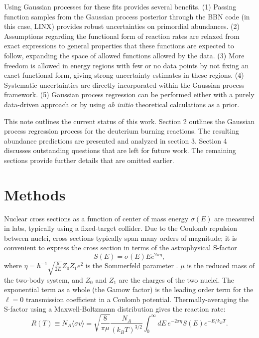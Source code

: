 \documentclass[%
 reprint,
superscriptaddress,
nofootinbib,
 amsmath,amssymb,
 aps,
 pra,
]{revtex4-2}
\begin{document}
Using Gaussian processes for these fits provides several benefits. (1) Passing function samples from the Gaussian process posterior through the BBN code (in this case, LINX) provides robust uncertainties on primordial abundances. (2) Assumptions regarding the functional form of reaction rates are relaxed from exact expressions to general properties that these functions are expected to follow, expanding the space of allowed functions allowed by the data. (3) More freedom is allowed in energy regions with few or no data points by not fixing an exact functional form, giving strong uncertainty estimates in these regions. (4) Systematic uncertainties are directly incorporated within the Gaussian process framework. (5) Gaussian process regression can be performed either with a purely data-driven approach or by using \textit{ab initio} theoretical calculations as a prior. 

This note outlines the current status of this work. Section 2 outlines the Gaussian process regression process for the deuterium burning reactions. The resulting abundance predictions are presented and analyzed in section 3. Section 4 discusses outstanding questions that are left for future work. The remaining sections provide further details that are omitted earlier. 




\section{Methods}



Nuclear cross sections as a function of center of mass energy $\sigma(E)$ are measured in labs, typically using a fixed-target collider. Due to the Coulomb repulsion between nuclei, cross sections typically span many orders of magnitude; it is convenient to express the cross section in terms of the astrophysical S-factor
\begin{equation}
	S(E) = \sigma(E) E e^{2\pi\eta},
\end{equation}
where $\eta = \hbar^{-1}\sqrt{\frac{\mu}{2E}}Z_0 Z_1 e^2$ is the Sommerfeld parameter \cite{Iliadis2015}. $\mu$ is the reduced mass of the two-body system, and $Z_0$ and $Z_1$ are the charges of the two nuclei. The exponential term as a whole (the Gamow factor) is the leading order term for the $\ell=0$ transmission coefficient in a Coulomb potential. Thermally-averaging the S-factor using a Maxwell-Boltzmann distribution gives the reaction rate:
\begin{equation}
	R(T) \equiv N_A \langle \sigma v \rangle = \sqrt{\frac{8}{\pi \mu}} \frac{N_A}{(k_B T)^{3/2}} \int_{0}^{\infty} dE \, e^{-2 \pi \eta} S(E) e^{-E/k_B T}.
\end{equation}
\end{document}
